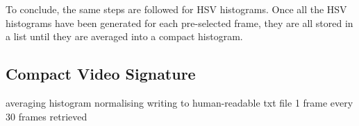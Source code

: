 To conclude, the same steps are followed for HSV histograms. Once all the HSV histograms have been generated for each pre-selected frame, they are all stored in a list until they are averaged into a compact histogram.



\subsection{Compact Video Signature}

averaging histogram
normalising
writing to human-readable txt file
1 frame every 30 frames retrieved







